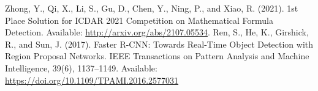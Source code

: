  Zhong, Y., Qi, X., Li, S., Gu, D., Chen, Y., Ning, P., and Xiao, R. (2021). 1st Place Solution for ICDAR 2021 Competition on Mathematical Formula Detection.  Available: \url{http://arxiv.org/abs/2107.05534}.
 Ren, S., He, K., Girshick, R., and Sun, J. (2017). Faster R-CNN: Towards Real-Time Object Detection with Region Proposal Networks. IEEE Transactions on Pattern Analysis and Machine Intelligence, 39(6), 1137–1149. Available: \url{https://doi.org/10.1109/TPAMI.2016.2577031}
